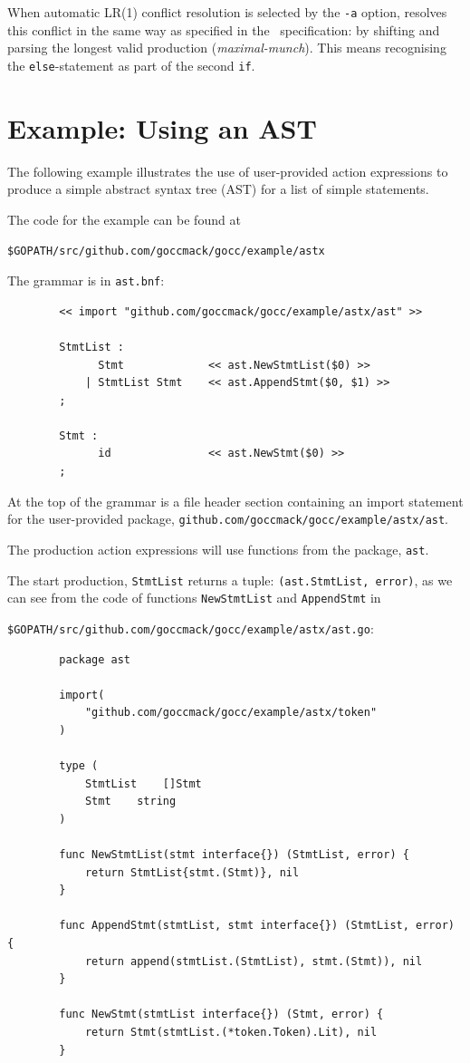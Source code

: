 \documentclass[12pt]{article}
\begin{document}
	When automatic LR(1) conflict resolution is selected by the \verb|-a| option, \gocc resolves this conflict in the same way as specified in the \Clang\ specification: by shifting and parsing the longest valid production ({\em maximal-munch}). This means recognising the \verb|else|-statement as part of the second \verb|if|.

\section{Example: Using an AST} \label{sec:example ast}
	The following example illustrates the use of user-provided action expressions to produce a simple abstract syntax tree (AST) for a list of simple statements.

	The code for the example can be found at

	\verb|$GOPATH/src/github.com/goccmack/gocc/example/astx|

	The grammar is in \verb|ast.bnf|:

	\begin{verbatim}
		<< import "github.com/goccmack/gocc/example/astx/ast" >>

		StmtList :
		      Stmt             << ast.NewStmtList($0) >>
		    | StmtList Stmt    << ast.AppendStmt($0, $1) >>
		;

		Stmt :
		      id               << ast.NewStmt($0) >>
		;
	\end{verbatim}

	At the top of the grammar is a file header section containing an import statement for the user-provided package,
	\verb|github.com/goccmack/gocc/example/astx/ast|.

	The production action expressions will use functions from the package, \verb|ast|.

	The start production, \verb"StmtList" returns a tuple: \verb|(ast.StmtList, error)|, as we can see from the code of functions
	\verb|NewStmtList| and \verb|AppendStmt| in

	\verb|$GOPATH/src/github.com/goccmack/gocc/example/astx/ast.go|:

	\begin{verbatim}
		package ast

		import(
		    "github.com/goccmack/gocc/example/astx/token"
		)

		type (
		    StmtList	[]Stmt
		    Stmt 	string
		)

		func NewStmtList(stmt interface{}) (StmtList, error) {
		    return StmtList{stmt.(Stmt)}, nil
		}

		func AppendStmt(stmtList, stmt interface{}) (StmtList, error) {
		    return append(stmtList.(StmtList), stmt.(Stmt)), nil
		}

		func NewStmt(stmtList interface{}) (Stmt, error) {
		    return Stmt(stmtList.(*token.Token).Lit), nil
		}
	\end{verbatim}
\end{document}
